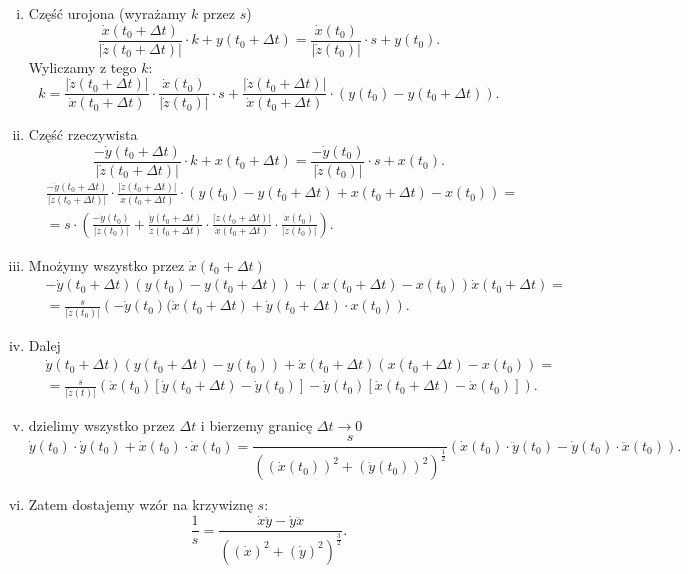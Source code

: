 \documentclass[../main.tex]{subfiles}
\begin{document}
\begin{enumerate}[i)]
    \item Część urojona (wyrażamy $k$ przez $s$)
\[
    \frac{\dot{x}(t_0 + \Delta t)}{\left| \dot{z}(t_0 + \Delta t) \right| }\cdot k + y(t_0 + \Delta t) = \frac{\dot{x}(t_0)}{\left| \dot{z}(t_0) \right| }\cdot s + y(t_0)
.\]
Wyliczamy z tego $k$:
\[
    k = \frac{\left| \dot{z}(t_0 + \Delta t) \right| }{\dot{x}(t_0 + \Delta t)} \cdot  \frac{\dot{x}(t_0)}{|\dot{z}(t_0)|}\cdot s + \frac{\left| \dot{z}(t_0 + \Delta t) \right| }{\dot{x}(t_0 + \Delta t)}\cdot (y(t_0) - y(t_0 + \Delta t))
.\]
\item Część rzeczywista
    \[
        \frac{-\dot{y}(t_0 + \Delta t)}{\left| \dot{z}(t_0 + \Delta t) \right| }\cdot k + x(t_0 + \Delta t) = \frac{-\dot{y}(t_0)}{\left| \dot{z}(t_0) \right| }\cdot s + x(t_0)
    .\]
\begin{align*}
    &\frac{-\dot{y}(t_0 + \Delta t)}{\left| \dot{z}(t_0 + \Delta t) \right| }\cdot \frac{\left|\dot{z}(t_0 + \Delta t)\right|}{\dot{x}(t_0 + \Delta t)}\cdot \left( y(t_0) - y(t_0 + \Delta t) + x(t_0 + \Delta t) - x(t_0) \right) =\\
    &= s\cdot \left( \frac{-\dot{y}(t_0)}{\left| \dot{z}(t_0) \right| } + \frac{\dot{y}(t_0 + \Delta t)}{\dot{z}(t_0 + \Delta t)}\cdot \frac{\left| \dot{z}(t_0 + \Delta t)\right|}{\dot{x}(t_0 + \Delta t)}\cdot \frac{\dot{x}(t_0)}{\left| \dot{z}(t_0) \right| }  \right)
.\end{align*}
\item Mnożymy wszystko przez $\dot{x}(t_0 + \Delta t)$
\begin{align*}
    &-\dot{y}(t_0 + \Delta t)\left( y(t_0) - y(t_0 + \Delta t)\right) + \left(x(t_0 + \Delta t) - x(t_0)\right)\dot{x}(t_0 + \Delta t) =\\
           &= \frac{s}{\left| \dot{z}(t_0) \right| }\left( -\dot{y}(t_0)(\dot{x}(t_0 + \Delta t) + \dot{y}(t_0 + \Delta t) \cdot x(t_0)\right)
.\end{align*}
\item Dalej
    \begin{align*}
        &\dot{y}(t_0 + \Delta t)\left( y(t_0 + \Delta t) - y(t_0) \right) + \dot{x}(t_0 + \Delta t) (x(t_0 + \Delta t) - x(t_0)) =\\
        &= \frac{s}{\left| \dot{z}(t) \right| }\left( \dot{x}(t_0)\left[ \dot{y}(t_0 + \Delta t) - \dot{y}(t_0) \right] - \dot{y}(t_0) \left[ \dot{x}(t_0 + \Delta t) - \dot{x}(t_0) \right]  \right)
    .\end{align*}
\item dzielimy wszystko przez $\Delta t$ i bierzemy granicę $\Delta t \to 0$
    \[
        \dot{y}(t_0) \cdot \dot{y}(t_0) + \dot{x}(t_0) \cdot \dot{x}(t_0) = \frac{s}{\left( \left( \dot{x}(t_0) \right) ^2 + \left( \dot{y}(t_0) \right) ^2 \right)^{\frac{1}{2}}} \left( \dot{x}(t_0) \cdot \ddot{y}(t_0) - \dot{y}(t_0) \cdot \ddot{x}(t_0) \right)
    .\]
    \item Zatem dostajemy wzór na krzywiznę $s$:
        \[
            \frac{1}{s} = \frac{\dot{x}\ddot{y} - \dot{y}\ddot{x}}{\left( \left( \dot{x} \right) ^2 + \left( \dot{y} \right)^2  \right)^{\frac{3}{2}} }
        .\]
\end{enumerate}
\end{document}
